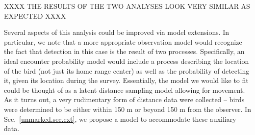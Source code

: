 XXXX THE RESULTS OF THE TWO ANALYSES LOOK VERY SIMILAR AS EXPECTED XXXX


Several aspects of this analysis could be improved via model
extensions. In particular, we note that a more appropriate observation
model would recognize the fact that detection in this case is the
result of two processes. Specifically, an ideal encounter probability
model would include a process describing the location of the bird (not
just its home range center) as well as the probability of detecting
it, given its location during the survey.
Essentially, the model we
would like to fit could be thought of as a latent distance sampling
model allowing for movement. As it turns out,
a very rudimentary form of distance data were collected -- birds were
determined to be either within 150 m or beyond 150 m from the
observer. In Sec.~\ref{unmarked.sec.ext}, we
propose a model to accommodate these auxiliary data.

